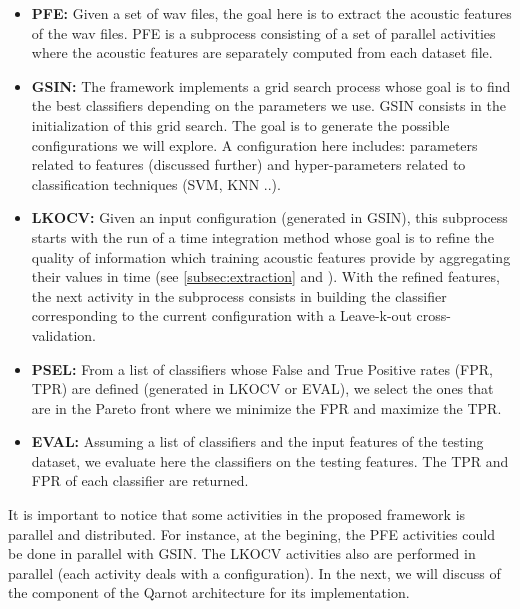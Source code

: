 \documentclass[10pt, conference, compsocconf]{IEEEtran}
\begin{document}
\begin{itemize}

\item {\bf PFE:} Given a set of wav files, the goal here is to extract the acoustic features of the wav files. PFE is a subprocess 
consisting of a set of parallel activities where the acoustic features are separately computed from each dataset file. 

\item {\bf GSIN:} The framework implements a grid search process whose goal is to find the best classifiers depending on the 
parameters we use. GSIN consists in the initialization of this grid search. The goal is to generate the possible configurations 
we will explore. A configuration here includes: parameters related to features (discussed further) and hyper-parameters related to 
classification techniques (SVM, KNN ..).

\item {\bf LKOCV:} Given an input configuration (generated in GSIN), this subprocess starts with the run of a 
  time integration method whose goal is to refine the quality of information which training acoustic features provide by aggregating their values in time (see \ref{subsec:extraction} and \cite{DBLP:journals/taslp/JoderER09}). With the refined features, the next activity 
in the subprocess consists in building the classifier corresponding to the current configuration with a Leave-k-out cross-validation.

\item {\bf PSEL:} From a list of classifiers whose False and True Positive rates (FPR, TPR) are defined (generated in LKOCV or EVAL), we select the ones that are in the Pareto front where we minimize the FPR and maximize the TPR.

\item {\bf EVAL:}  Assuming a list of classifiers and the input features of the testing dataset, we evaluate here the classifiers on the testing features. The TPR and FPR of each classifier are returned.

\end{itemize}

It is important to notice that some activities in the proposed framework is parallel and distributed. For instance, at the begining, 
the PFE activities could be done in parallel with GSIN. The LKOCV activities also are performed in parallel (each activity deals  
with a configuration). In the next, we will discuss of the component of the Qarnot architecture for 
its implementation.
\end{document}
